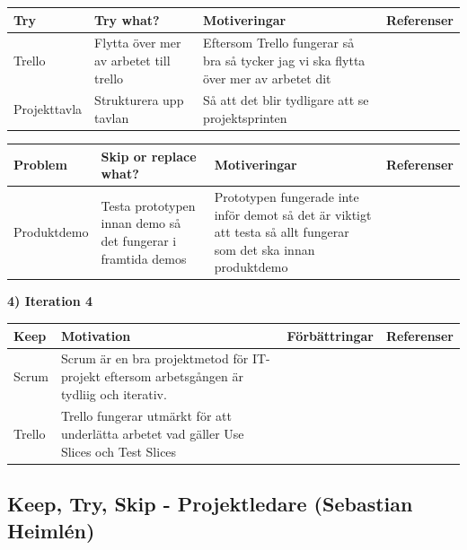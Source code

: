\documentclass[conference,a4paper]{IEEEtran}
\newcommand\Tstrut{\rule{0pt}{2.6ex}}       %
\newcommand\Bstrut{\rule[-0.9ex]{0pt}{0pt}} %
\newcommand{\TBstrut}{\Tstrut\Bstrut} %
\begin{document}
\begin{table}[H]
	\small
  \centering
	\begin{tabular}{|p{1.5cm}|p{2cm}|p{1.8cm}|p{1.5cm}|} %
    \hline
    Try & Try what? & Motiveringar & Referenser \TBstrut \\
    \hline
    Trello & Flytta över mer av arbetet till trello & Eftersom Trello fungerar så bra så tycker jag vi ska flytta över mer av arbetet dit & \TBstrut \\
    \hline
    Projekttavla & Strukturera upp tavlan & Så att det blir tydligare att se projektsprinten & \TBstrut \\
    \hline
  \end{tabular}
\end{table}

\begin{table}[H]
	\small
  \centering
	\begin{tabular}{|p{1.5cm}|p{2cm}|p{1.8cm}|p{1.5cm}|} %
    \hline
    Problem & Skip or replace what? & Motiveringar & Referenser \TBstrut \\
    \hline
    Produktdemo & Testa prototypen innan demo så det fungerar i framtida demos & Prototypen fungerade inte inför demot så det är viktigt att testa så allt fungerar som det ska innan produktdemo &\TBstrut \\
    \hline
  \end{tabular}
\end{table}

\textbf{4) Iteration 4}


\begin{table}[H]
	\small
  \centering
	\begin{tabular}{|p{1.5cm}|p{2cm}|p{1.8cm}|p{1.5cm}|} %
    \hline
    Keep & Motivation & Förbättringar & Referenser \TBstrut \\
    \hline
    Scrum & Scrum är en bra projektmetod för IT-projekt eftersom arbetsgången är tydliig och iterativ. &  &\TBstrut \\
    \hline
   Trello & Trello fungerar utmärkt för att underlätta arbetet vad gäller Use Slices och Test Slices &  &\TBstrut \\
    \hline
  \end{tabular}
\end{table}



\subsection{Keep, Try, Skip - Projektledare (Sebastian Heimlén)}
\end{document}
